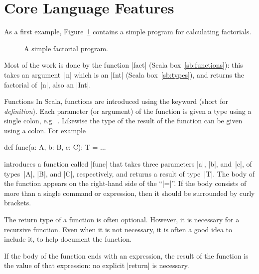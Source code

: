 \section{Core Language Features}
\label{sec:scala-core}

As a first example, Figure~\ref{fig:factorial} contains a simple program for
calculating factorials.
%
\begin{figure}
\caption{A simple factorial program.}
\label{fig:factorial}
\end{figure}


Most of the work is done by the function |fact| (Scala
box~\ref{sb:functions}): this takes an argument~|n| which is an |Int| (Scala
box~\ref{sb:types}), and returns the factorial of~|n|, also an |Int|.



\begin{scalaBox}{Functions}
\label{sb:functions}
In Scala, functions are introduced using the keyword  (short for
\emph{definition}).  Each parameter (or argument) of the function is given a
type using a single colon, e.g.~.  Likewise the type of the result
of the function can be given using a colon.  For example
\begin{scala}
  def func(a: A, b: B, c: C): T = ...
\end{scala}
introduces a function called |func| that takes three parameters |a|, |b|,
and~|c|, of types~|A|, |B|, and |C|, respectively, and returns a result of
type~|T|.  The body of the function appears on the right-hand side of the
``|=|''.  If the body consists of more than a single command or expression,
then it should be surrounded by curly brackets.

The return type of a function is often optional.  However, it is necessary for
a recursive function.  Even when it is not necessary, it is often a good idea
to include it, to help document the function.

If the body of the function ends with an expression, the result of the
function is the value of that expression: no explicit |return| is necessary.
\end{scalaBox}

